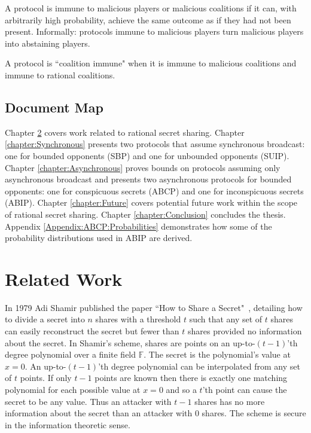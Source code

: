 \documentclass{dalcsthesis}
\begin{document}
A protocol is immune to malicious players or malicious coalitions if it can, with arbitrarily high probability, achieve the same outcome as if they had not been present. Informally: protocols immune to malicious players turn malicious players into abstaining players.

A protocol is ``coalition immune" when it is immune to malicious coalitions and immune to rational coalitions.

\section{Document Map}

Chapter \ref{chapter:RelatedWork} covers work related to rational secret sharing. Chapter \ref{chapter:Synchronous} presents two protocols that assume synchronous broadcast: one for bounded opponents (SBP) and one for unbounded opponents (SUIP). Chapter \ref{chapter:Asynchronous} proves bounds on protocols assuming only asynchronous broadcast and presents two asynchronous protocols for bounded opponents: one for conspicuous secrets (ABCP) and one for inconspicuous secrets (ABIP). Chapter \ref{chapter:Future} covers potential future work within the scope of rational secret sharing. Chapter \ref{chapter:Conclusion} concludes the thesis. Appendix \ref{Appendix:ABCP:Probabilities} demonstrates how some of the probability distributions used in ABIP are derived.




\chapter{Related Work}
\label{chapter:RelatedWork}

In 1979 Adi Shamir published the paper ``How to Share a Secret"~\cite{shamir79}, detailing how to divide a secret into $n$ shares with a threshold $t$ such that any set of $t$ shares can easily reconstruct the secret but fewer than $t$ shares provided no information about the secret. In Shamir's scheme, shares are points on an up-to-$(t-1)$'th degree polynomial over a finite field $\mathbb{F}$. The secret is the polynomial's value at $x=0$. An up-to-$(t-1)$'th degree polynomial can be interpolated from any set of $t$ points. If only $t-1$ points are known then there is exactly one matching polynomial for each possible value at $x=0$ and so a $t$'th point can cause the secret to be any value. Thus an attacker with $t-1$ shares has no more information about the secret than an attacker with $0$ shares. The scheme is secure in the information theoretic sense.
\end{document}
